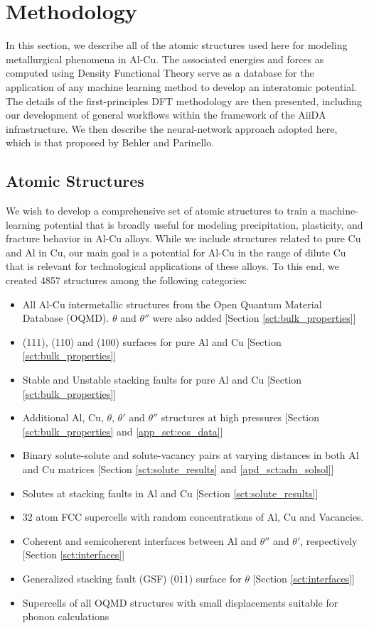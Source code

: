 \documentclass{article}
\begin{document}
\section{Methodology}

In  this section, we describe all of the atomic structures used here for modeling metallurgical phenomena in Al-Cu.  The associated energies and forces as computed using Density Functional Theory serve as a database for the application of any machine learning method to develop an interatomic potential.  The details of the first-principles DFT methodology are then presented, including our development of general workflows within the framework of the AiiDA infrastructure. 
We then describe the neural-network approach adopted here, which is that proposed by Behler and Parinello.

\subsection{Atomic Structures} \label{sct:atomic_structures}

We wish to develop a comprehensive set of atomic structures to train a machine-learning potential that is broadly useful for modeling precipitation, plasticity, and fracture behavior in Al-Cu alloys.  While we include structures related to pure Cu and Al in Cu, our main goal is a potential for Al-Cu in the range of dilute Cu that is relevant for technological applications of these alloys.  To this end, we created 4857 structures among the following categories:
\begin{itemize}
    \item All Al-Cu intermetallic structures from the Open Quantum Material Database (OQMD)\cite{Kirklin2015}. $\theta$ and $\theta''$ were also added  [Section \ref{sct:bulk_properties}]
    \item (111), (110) and (100) surfaces for pure Al and Cu [Section \ref{sct:bulk_properties}]
    \item Stable and Unstable stacking faults for pure Al and Cu [Section \ref{sct:bulk_properties}]
    \item Additional Al, Cu, $\theta$, $\theta'$ and $\theta''$ structures at high pressures [Section \ref{sct:bulk_properties} and \ref{app_sct:eos_data}]
    \item Binary solute-solute and solute-vacancy pairs at varying distances in both Al and Cu matrices  [Section \ref{sct:solute_results} and \ref{apd_sct:adn_solsol}]
    \item Solutes at stacking faults in Al and Cu  [Section \ref{sct:solute_results}]
    \item 32 atom FCC supercells with random concentrations of Al, Cu and Vacancies. 
    \item Coherent and semicoherent interfaces between Al and $\theta''$  and $\theta'$, respectively [Section \ref{sct:interfaces}]
    \item Generalized stacking fault (GSF) (0$\overline{1}$1) surface for $\theta$ [Section \ref{sct:interfaces}]
    \item Supercells of all OQMD structures with small displacements suitable for phonon calculations
\end{itemize}
\end{document}
